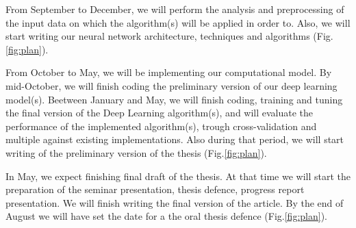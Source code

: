 \documentclass[12pt]{article}
\begin{document}
From September to December, we will perform the analysis and preprocessing of the input data on which the algorithm(s) will be applied in order to. Also, we will start writing our neural network architecture, techniques and algorithms (Fig.\ref{fig:plan}). 

From October to May, we will be implementing our computational model. By mid-October, we will finish coding the preliminary version of our deep learning model(s). Beetween January and May, we will finish coding, training and tuning the final version of the Deep Learning algorithm(s), and will evaluate the performance of the implemented algorithm(s), trough cross-validation and multiple against existing implementations. Also during that period, we will start writing of the preliminary version of the thesis (Fig.\ref{fig:plan}).

In May, we expect finishing final draft of the thesis. At that time we will start the preparation of the seminar presentation, thesis defence, progress report presentation. We will finish writing the final version of the article. By the end of August we will have set the date for a the oral thesis defence (Fig.\ref{fig:plan}). 

\printbibliography[title={Bibliography},nottype=misc,resetnumbers=true]
\end{document}
